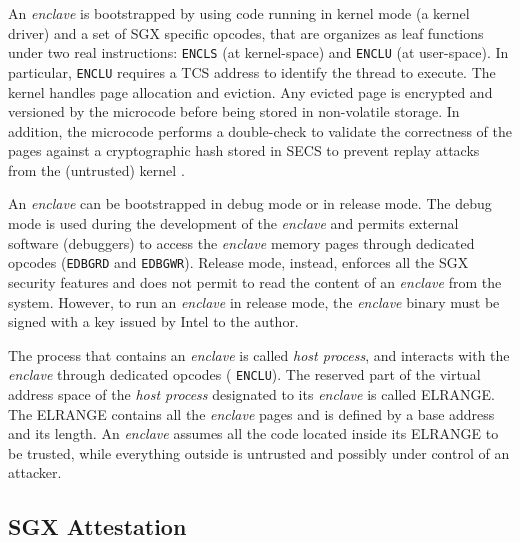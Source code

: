 An \emph{enclave} is bootstrapped by using code running in kernel mode
(\ie a kernel driver) and a set of SGX specific opcodes, that are organizes
as leaf functions under two real instructions: \texttt{ENCLS} (at kernel-space)
and \texttt{ENCLU} (at user-space).
In particular, \texttt{ENCLU} requires a TCS address to identify the thread to
execute.
The kernel handles page allocation and eviction. Any evicted page is encrypted
and versioned by the microcode before being stored in non-volatile storage.
In addition, the microcode performs a double-check to validate the correctness 
of the pages against a cryptographic hash stored in SECS 
to prevent replay attacks from the (untrusted) kernel \citep{rozas2013intel}.

An \emph{enclave} can be bootstrapped in debug mode or in release mode.
The debug mode is used during the development of the \emph{enclave} and permits
external software (\eg debuggers) to access the \emph{enclave} memory
pages through dedicated opcodes (\ie \texttt{EDBGRD} and \texttt{EDBGWR}).
Release mode, instead, enforces all the SGX security features and
does not permit to read the content of an \emph{enclave} from the system.
However, to run an \emph{enclave} in release mode, the \emph{enclave} binary
must be signed with a key issued by Intel to the author.

The process that contains an \emph{enclave} is called \emph{host process}, and
interacts with the \emph{enclave} through dedicated opcodes (\ie
\texttt{ENCLU}).
The reserved part of the virtual address space of the \emph{host process}
designated to its \emph{enclave} is called ELRANGE. The ELRANGE contains
all the \emph{enclave} pages and is defined by a base address and its length.
An \emph{enclave} assumes all the code located inside its ELRANGE to be
trusted, while everything outside is untrusted and possibly under control of an
attacker.

\subsection{SGX Attestation}
\label{ssec:sgx-remote-attestation}

